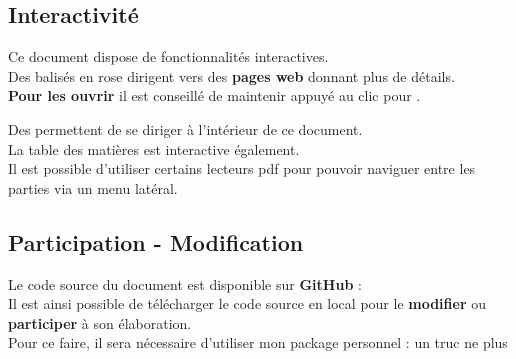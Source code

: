 \subsection*{Interactivité}

Ce document dispose de fonctionnalités interactives. \\
Des  balisés en {\color{monrose}rose} dirigent vers des \textbf{pages web} donnant plus de détails. \\
\textbf{Pour les ouvrir} il est conseillé de maintenir  appuyé au clic pour . 

Des  permettent de se diriger à l'intérieur de ce document. \\

La table des matières est interactive également. \\

Il est possible d'utiliser certains lecteurs pdf pour pouvoir naviguer entre les parties via un menu latéral. 

\subsection*{Participation - Modification}

Le code source du document est disponible sur \textbf{GitHub} : \\
Il est ainsi possible de télécharger le code source en local pour le \textbf{modifier} ou \textbf{participer} à son élaboration. \\
Pour ce faire, il sera nécessaire d'utiliser mon package personnel : 
un truc ne plus